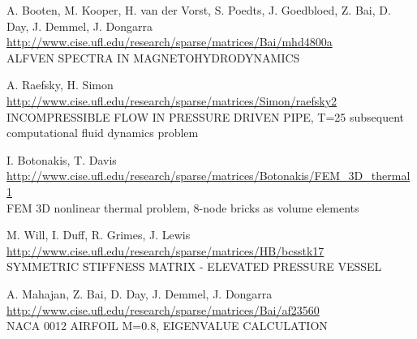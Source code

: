 	{
		{
			A. Booten, M. Kooper, H. van der Vorst, S. Poedts, J. Goedbloed, Z. Bai, D. Day, J. Demmel, J. Dongarra 
		}
		{
			\url{http://www.cise.ufl.edu/research/sparse/matrices/Bai/mhd4800a} \\
			ALFVEN SPECTRA IN MAGNETOHYDRODYNAMICS
		}
	}

	{
		{
			 A. Raefsky, H. Simon 
		}
		{
			\url{http://www.cise.ufl.edu/research/sparse/matrices/Simon/raefsky2} \\
			INCOMPRESSIBLE FLOW IN PRESSURE DRIVEN PIPE, T=25
			subsequent computational fluid dynamics problem 
		}
	}

	{
		{
			I. Botonakis, T. Davis 
		}
		{
			\url{http://www.cise.ufl.edu/research/sparse/matrices/Botonakis/FEM_3D_thermal1} \\
			FEM 3D nonlinear thermal problem, 8-node bricks as volume elements
		}
	}
	
	{
		{
			 M. Will, I. Duff, R. Grimes, J. Lewis 
		}
		{
			\url{http://www.cise.ufl.edu/research/sparse/matrices/HB/bcsstk17} \\
			SYMMETRIC STIFFNESS MATRIX - ELEVATED PRESSURE VESSEL
		}
	}

	{
		{
			 A. Mahajan, Z. Bai, D. Day, J. Demmel, J. Dongarra 
		}
		{
			\url{http://www.cise.ufl.edu/research/sparse/matrices/Bai/af23560 } \\
			 NACA 0012 AIRFOIL  M=0.8, EIGENVALUE CALCULATION
		}
	}
	
